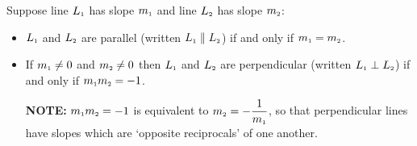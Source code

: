 \documentclass{ximera}
\begin{document}
\medskip

\colorbox{ResultColor}{\bbm


\begin{thm}  Suppose line $L_{\mbox{\tiny$1$}}$ has slope $m_{\mbox{\tiny$1$}}$ and line $L_{\mbox{\tiny$2$}}$ has slope $m_{\mbox{\tiny$2$}}$:


\label{parallelperpendicularslopetheorem}


\begin{itemize}

\item $L_{\mbox{\tiny$1$}}$ and $L_{\mbox{\tiny$2$}}$ are parallel (written $L_{\mbox{\tiny$1$}} \parallel L_{\mbox{\tiny$2$}}$) if and only if $m_{\mbox{\tiny$1$}} = m_{\mbox{\tiny$2$}}$.

\item If $m_{\mbox{\tiny$1$}} \neq 0$ and  $m_{\mbox{\tiny$2$}} \neq 0$ then $L_{\mbox{\tiny$1$}}$ and $L_{\mbox{\tiny$2$}}$ are perpendicular (written $L_{\mbox{\tiny$1$}} \perp L_{\mbox{\tiny$2$}}$) if and only if $m_{\mbox{\tiny$1$}} m_{\mbox{\tiny$2$}} = -1$.

\textbf{NOTE:} $m_{\mbox{\tiny$1$}} m_{\mbox{\tiny$2$}} = -1$  is equivalent to $m_{\mbox{\tiny$2$}} = -\dfrac{1}{m_{\mbox{\tiny$1$}}}$, so that perpendicular lines have slopes which are `opposite reciprocals' of one another.

\end{itemize}

\end{thm}

\ebm}
\end{document}
